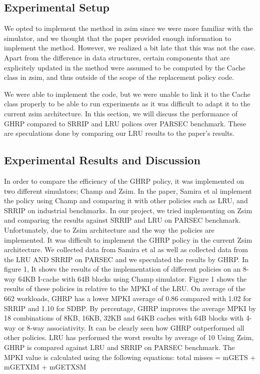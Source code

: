 \documentclass[11pt]{article}
\begin{document}
\subsection{Experimental Setup}
We opted to implement the method in zsim since we were more familiar with the simulator, and we thought that the paper provided enough information to implement the method.
However, we realized a bit late that this was not the case. Apart from the difference in data structures, certain components that are explicitely updated in the method were assumed to be computed by the Cache class in zsim, and thus outside of the scope of the replacement policy code.\par
We were able to implement the code, but we were unable to link it to the Cache class properly to be able to run experiments as it was difficult to adapt it to the current zsim architecture. 
In this section, we will discuss the performance of GHRP compared to SRRIP and LRU polices over PARSEC benchmark. These are speculations done by comparing our LRU results to the paper's results.

\subsection{Experimental Results and Discussion}
In order to compare the efficiency of the GHRP policy, it was implemented on two different simulators; Champ and Zsim. In the paper, Samira et al implement the policy using
Champ and comparing it with other policies such as LRU, and SRRIP on industrial benchmarks. In our project, we tried implementing on Zsim and comparing the results against 
SRRIP and LRU on PARSEC benchmark. Unfortunately, due to Zsim architecture and the way the policies are implemented. It was difficult to implement the GHRP policy in the 
current Zsim architecture. We collected data from Samira et al as well as collected data from the  LRU AND SRRIP on PARSEC and we speculated the results by GHRP. In figure 1,
It shows the results of the implementation of different policies on an 8-way 64KB I-cache with 64B blocks using Champ simulator. Figure 1 shows the results of these policies in
relative to the MPKI of the LRU. On average of the 662 workloads, GHRP has a lower MPKI average of 0.86 compared with 1.02 for SRRIP and 1.10 for SDBP. By percentage, GHRP 
improves the average MPKI by 18%
combinations of 8KB,  16KB, 32KB and 64KB caches with 64B blocks with 4-way or 8-way associativity. It can be clearly seen how GHRP outperformed all other policies. LRU has
performed the worst results by average of 10%
Using Zsim, GHRP is compared against LRU and SRRIP on PARSEC benchmark. The MPKI value is calculated using the following equations:  
total misses = mGETS + mGETXIM + mGETXSM
\end{document}
